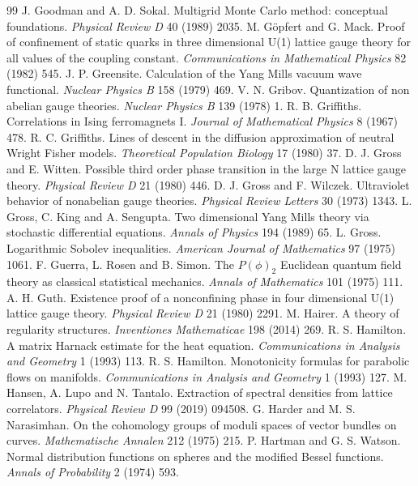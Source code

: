 \begin{thebibliography}{99}
 J. Goodman and A. D. Sokal. Multigrid Monte Carlo method: conceptual foundations. \emph{Physical Review D} 40 (1989) 2035.
 M. G\"opfert and G. Mack. Proof of confinement of static quarks in three dimensional U(1) lattice gauge theory for all values of the coupling constant. \emph{Communications in Mathematical Physics} 82 (1982) 545.
 J. P. Greensite. Calculation of the Yang Mills vacuum wave functional. \emph{Nuclear Physics B} 158 (1979) 469.
 V. N. Gribov. Quantization of non abelian gauge theories. \emph{Nuclear Physics B} 139 (1978) 1.
 R. B. Griffiths. Correlations in Ising ferromagnets I. \emph{Journal of Mathematical Physics} 8 (1967) 478.
 R. C. Griffiths. Lines of descent in the diffusion approximation of neutral Wright Fisher models. \emph{Theoretical Population Biology} 17 (1980) 37.
 D. J. Gross and E. Witten. Possible third order phase transition in the large N lattice gauge theory. \emph{Physical Review D} 21 (1980) 446.
 D. J. Gross and F. Wilczek. Ultraviolet behavior of nonabelian gauge theories. \emph{Physical Review Letters} 30 (1973) 1343.
 L. Gross, C. King and A. Sengupta. Two dimensional Yang Mills theory via stochastic differential equations. \emph{Annals of Physics} 194 (1989) 65.
 L. Gross. Logarithmic Sobolev inequalities. \emph{American Journal of Mathematics} 97 (1975) 1061.
 F. Guerra, L. Rosen and B. Simon. The $P(\phi)_2$ Euclidean quantum field theory as classical statistical mechanics. \emph{Annals of Mathematics} 101 (1975) 111.
 A. H. Guth. Existence proof of a nonconfining phase in four dimensional U(1) lattice gauge theory. \emph{Physical Review D} 21 (1980) 2291.
 M. Hairer. A theory of regularity structures. \emph{Inventiones Mathematicae} 198 (2014) 269.
 R. S. Hamilton. A matrix Harnack estimate for the heat equation. \emph{Communications in Analysis and Geometry} 1 (1993) 113.
 R. S. Hamilton. Monotonicity formulas for parabolic flows on manifolds. \emph{Communications in Analysis and Geometry} 1 (1993) 127.
 M. Hansen, A. Lupo and N. Tantalo. Extraction of spectral densities from lattice correlators. \emph{Physical Review D} 99 (2019) 094508.
 G. Harder and M. S. Narasimhan. On the cohomology groups of moduli spaces of vector bundles on curves. \emph{Mathematische Annalen} 212 (1975) 215.
 P. Hartman and G. S. Watson. Normal distribution functions on spheres and the modified Bessel functions. \emph{Annals of Probability} 2 (1974) 593.

\end{thebibliography}

